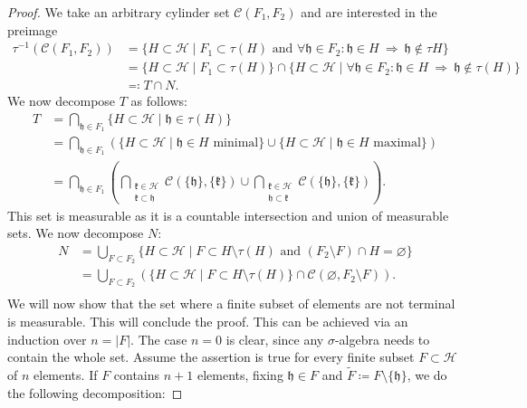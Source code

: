 \begin{proof}
  We take an arbitrary cylinder set \(\mathcal{C}(F_1, F_2)\) and are interested in the preimage
  \begin{align*}
    \tau^{-1}(\mathcal{C}(F_1, F_2))
    & = \{H \subset \mathcal{H} \mid F_1 \subset \tau(H) \text{ and } \forall \mathfrak{h} \in F_2\colon \mathfrak{h} \in H\ \Rightarrow\ \mathfrak{h} \not\in \tau{H}\} \\
    & = \{H \subset \mathcal{H} \mid F_1 \subset \tau(H)\} \cap \{H \subset \mathcal{H} \mid \forall \mathfrak{h} \in F_2\colon \mathfrak{h} \in H\ \Rightarrow\ \mathfrak{h} \not\in \tau(H)\}\\
    & \eqqcolon T \cap N.
  \end{align*}
  We now decompose \(T\) as follows:
  \begin{align*}
    T
    & = \bigcap_{\mathfrak{h} \in F_1}\{H \subset \mathcal{H} \mid \mathfrak{h} \in \tau(H)\}\\
    & = \bigcap_{\mathfrak{h} \in F_1}\left (\{H \subset \mathcal{H} \mid \mathfrak{h} \in H \text{ minimal}\} \cup \{H \subset \mathcal{H} \mid \mathfrak{h} \in H \text{ maximal}\}\right )\\
    & = \bigcap_{\mathfrak{h} \in F_1}\left ( \bigcap_{\substack{\mathfrak{k} \in \mathcal{H}\\\mathfrak{k} \subset \mathfrak{h}}}\mathcal{C}(\{\mathfrak{h}\}, \{\mathfrak{k}\}) \cup \bigcap_{\substack{\mathfrak{k} \in \mathcal{H}\\\mathfrak{h} \subset\mathfrak{k}}} \mathcal{C}(\{\mathfrak{h}\}, \{\mathfrak{k}\})\right ).
  \end{align*}
  This set is measurable as it is a countable intersection and union of measurable sets. We now decompose \(N\):
  \begin{align*}
    N
    & = \bigcup_{F \subset F_2} \{H \subset \mathcal{H} \mid F \subset H \setminus \tau(H) \text{ and } (F_2 \setminus F) \cap H = \varnothing\}\\
    & = \bigcup_{F \subset F_2} \left ( \{H \subset \mathcal{H} \mid F \subset H \setminus \tau(H)\} \cap \mathcal{C}(\varnothing, F_2 \setminus F)\right).\\
  \end{align*}
  We will now show that the set where a finite subset of elements are not terminal is measurable. This will conclude the proof. This can be achieved via an induction over \(n = |F|\). The case \(n = 0\) is clear, since any \(\sigma\)-algebra needs to contain the whole set. Assume the assertion is true for every finite subset \(F \subset \mathcal{H}\) of \(n\) elements. If \(F\) contains \(n+1\) elements, fixing \(\mathfrak{h} \in F\) and \(\tilde F \coloneqq F \setminus \{\mathfrak{h}\}\), we do the following decomposition:

\end{proof}
